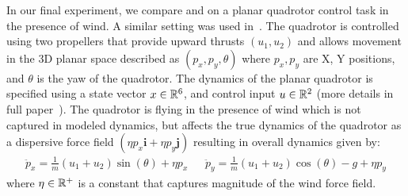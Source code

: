 In our final experiment, we compare \MM{} and \ILC{} on a planar quadrotor control
task in the presence of wind. A similar setting was used
in~\cite{DBLP:conf/icml/AgarwalHMS21}. The quadrotor is controlled using two propellers
that provide upward
thrusts $(u_{1}, u_{2})$ and allows movement in the $3$D planar space
described as
$(p_{x}, p_{y}, \theta)$ where $p_{x}, p_{y}$ are X, Y positions, and
$\theta$ is the yaw of the quadrotor. The dynamics of the planar quadrotor
is specified
using a state vector $x \in \mathbb{R}^{6}$, and control input $u \in
\mathbb{R}^{2}$ (more details in full paper~\cite{DBLP:journals/corr/abs-2111-09434}).
The quadrotor is flying in the presence of wind which is not captured in modeled
dynamics, but affects the true dynamics of the quadrotor as a dispersive force
field $(\eta p_{x}\mathbf{i} + \eta p_{y} \mathbf{j})$ resulting in
overall dynamics given by:
\begin{align*}
  \ddot{p}_{x} = \frac{1}{m}(u_{1} + u_{2})\sin(\theta) + \eta p_{x}~~~~~~~
  \ddot{p}_{y} = \frac{1}{m}(u_{1} + u_{2})\cos(\theta) - g + \eta p_{y}
\end{align*}
where $\eta \in \mathbb{R}^{+}$ is a constant that captures magnitude of the wind
force field.

